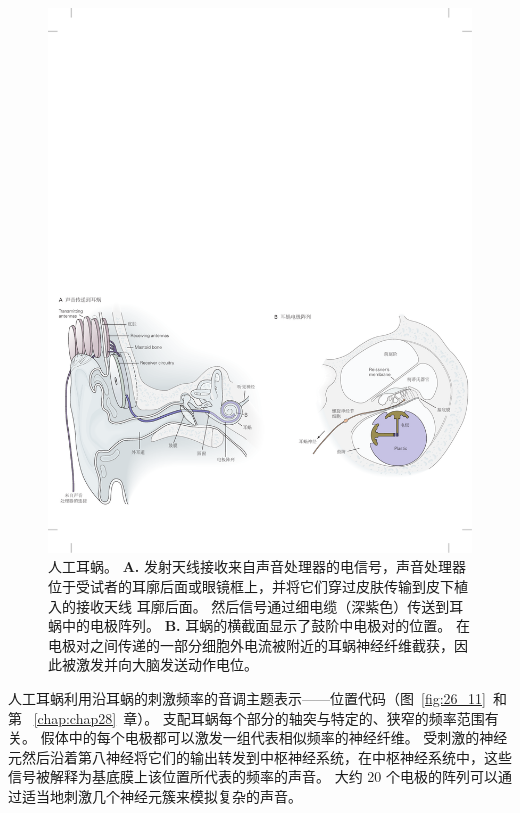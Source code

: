 \begin{figure}[htbp]
	\centering
	\includegraphics[width=1.0\linewidth]{chap26/fig_26_19}
	\caption{人工耳蜗。
		\textbf{A.} 发射天线接收来自声音处理器的电信号，声音处理器位于受试者的耳廓后面或眼镜框上，并将它们穿过皮肤传输到皮下植入的接收天线 耳廓后面。
		然后信号通过细电缆（深紫色）传送到耳蜗中的电极阵列。
		\textbf{B.} 耳蜗的横截面显示了鼓阶中电极对的位置。
		在电极对之间传递的一部分细胞外电流被附近的耳蜗神经纤维截获，因此被激发并向大脑发送动作电位。}
	\label{fig:26_19}
\end{figure}


人工耳蜗利用沿耳蜗的刺激频率的音调主题表示——位置代码（图~\ref{fig:26_11}~和第~ \ref{chap:chap28}~章）。
支配耳蜗每个部分的轴突与特定的、狭窄的频率范围有关。
假体中的每个电极都可以激发一组代表相似频率的神经纤维。
受刺激的神经元然后沿着第八神经将它们的输出转发到中枢神经系统，在中枢神经系统中，这些信号被解释为基底膜上该位置所代表的频率的声音。
大约 20 个电极的阵列可以通过适当地刺激几个神经元簇来模拟复杂的声音。


